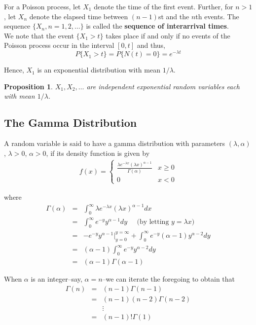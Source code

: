 \documentclass[12pt]{article}
\newtheorem{proposition}[theorem]{Proposition}
\begin{document}
For a Poisson process, let $X_1$ denote the time of the first event. Further, for $n>1$, let $X_n$ denote the elapsed time between $(n-1)$st and the $n$th events. The sequence $\{ X_n, n = 1,2,\dots \}$ is called the \textbf{sequence of interarrival times}. \\

We note that the event $\{ X_1 > t\}$ takes place if and only if no events of the Poisson process occur in the interval $[0,t]$ and thus,
\begin{equation*}
  P\{ X_1 > t \} = P\{ N(t)=0 \} = e^{-\lambda t}
\end{equation*}

Hence, $X_1$ is an exponential distribution with mean $1 / \lambda$.

\begin{proposition}
  $X_1, X_2, \dots$ are independent exponential random variables each with mean $1 / \lambda$.
\end{proposition}

\subsection{The Gamma Distribution}

A random variable is said to have a gamma distribution with parameters $(\lambda, \alpha)$, $\lambda > 0$, $\alpha > 0$, if its density function is given by
\begin{eqnarray*}
  f(x) =
  \begin{cases}
    \frac{\lambda e^{-\lambda x} (\lambda x)^{\alpha - 1}}{\Gamma(\alpha)}
    & x \ge 0 \\
    0 & x < 0
  \end{cases}
\end{eqnarray*}

where
\begin{eqnarray*}
  \Gamma (\alpha)
  &=& \int_0^{\infty} \lambda e^{-\lambda x} (\lambda x)^{\alpha-1} dx \\
  &=& \int_0^{\infty} e^{-y} y^{\alpha - 1} dy \;\;\;\;\;
  \text{(by letting $y = \lambda x$)} \\
  &=& -e^{-y} y^{\alpha - 1} \Big |_{y=0}^{y=\infty}
  + \int_0^{\infty} e^{-y} (\alpha - 1) y^{\alpha - 2} dy \\
  &=& (\alpha - 1) \int_0^{\infty} e^{-y} y^{\alpha-2} dy \\
  &=& (\alpha - 1) \Gamma (\alpha -1)
\end{eqnarray*}

When $\alpha$ is an integer--say, $\alpha = n$--we can iterate the foregoing to obtain that
\begin{eqnarray*}
  \Gamma(n)
  &=& (n-1) \Gamma (n-1) \\
  &=& (n-1) (n-2) \Gamma (n-2) \\
  &&  \vdots \\
  &=& (n-1)!\Gamma (1)
\end{eqnarray*}
\end{document}

